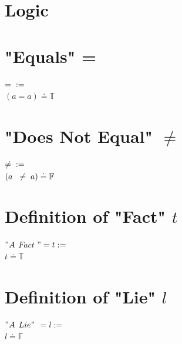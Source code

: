 \documentclass[11pt]{article}
\begin{document}
\section*{Logic}



\section{"Equals" =}
\begin{center}
$
= \hspace{2mm} :=
$
\\ \vspace{4mm}
$
(a = a) \doteq \mathbb{T}
$
\end{center}




\section{"Does Not Equal" $\neq$}
\begin{center}
$
\neq \hspace{2mm} :=
$
\\ \vspace{4mm}
$
(a \hspace{2mm} \neq \hspace{1mm} a) \doteq \mathbb{F}
$
\end{center}




\section{Definition of "Fact" $t$}
\begin{center}
$
"A$ $Fact$ $" = t :=
$
\\ \vspace{2mm}
$
t \doteq \mathbb{T}
$
\end{center}







\section{Definition of "Lie" $l$}
\begin{center}
$
"A$ $Lie"$ $= l :=
$
\\ \vspace{2mm}
$
l \doteq \mathbb{F}
$
\end{center}
\end{document}
